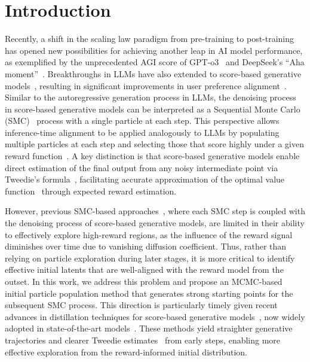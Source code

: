 \section{Introduction}
\label{sec:intro}

Recently, a shift in the scaling law paradigm from pre-training to post-training has opened new possibilities for achieving another leap in AI model performance, as exemplified by the unprecedented AGI score of GPT-o3~\cite{openai:o3} and DeepSeek’s ``Aha moment''~\cite{Guo2025:deepseek}. Breakthroughs in LLMs have also extended to score-based generative models~\cite{sohldickstein2015deep, song2020sde, ho2020ddpm, albergo2023stochasticinterpolantsunifyingframework, ma2024sitexploringflowdiffusionbased}, resulting in significant improvements in user preference alignment~\cite{uehara2025inference}. Similar to the autoregressive generation process in LLMs, the denoising process in score-based generative models can be interpreted as a Sequential Monte Carlo (SMC)~\cite{doucet2001sequential, del2006sequential, chopin2020introduction} process with a single particle at each step. This perspective allows inference-time alignment to be applied analogously to LLMs by populating multiple particles at each step and selecting those that score highly under a given reward function~\cite{uehara2025inference, kim2025DAS, kim2025inference, wu2023tds, dou2024fps, singh2025code, li2024svdd}. A key distinction is that score-based generative models enable direct estimation of the final output from any noisy intermediate point via Tweedie’s formula~\cite{efron2011tweedie}, facilitating accurate approximation of the optimal value function~\cite{uehara2024understanding, uehara2025inference, uehara2024finetuningcontinuoustimediffusionmodels} through expected reward estimation. 

However, previous SMC-based approaches~\cite{kim2025DAS, dou2024fps, wu2023tds, trippe2023smcdiff, cardoso2024mcgdiff}, where each SMC step is coupled with the denoising process of score-based generative models, are limited in their ability to effectively explore high-reward regions, as the influence of the reward signal diminishes over time due to vanishing diffusion coefficient. Thus, rather than relying on particle exploration during later stages, it is more critical to identify effective initial latents that are well-aligned with the reward model from the outset.
In this work, we address this problem and propose an MCMC-based initial particle population method that generates strong starting points for the subsequent SMC process. 
This direction is particularly timely given recent advances in distillation techniques for score-based generative models~\cite{song2023consistency, kim2023consistency, lu2025scm, sauer2024ladd, liu2023flow}, now widely adopted in state-of-the-art models~\cite{BlackForestLabs:2024Flux, chen2025sanasprint}. These methods yield straighter generative trajectories and clearer Tweedie estimates~\cite{efron2011tweedie} from early steps, enabling more effective exploration from the reward-informed initial distribution.

